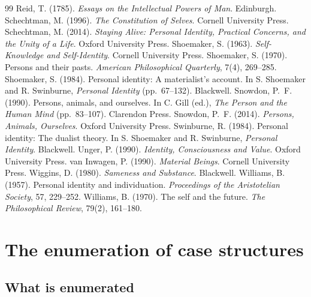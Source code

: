 \documentclass{situationist-preprint}
\begin{document}
\begin{thebibliography}{99}
 Reid, T. (1785). \emph{Essays on the Intellectual Powers of Man}. Edinburgh.
 Schechtman, M. (1996). \emph{The Constitution of Selves}. Cornell University Press.
 Schechtman, M. (2014). \emph{Staying Alive: Personal Identity, Practical Concerns, and the Unity of a Life}. Oxford University Press.
 Shoemaker, S. (1963). \emph{Self-Knowledge and Self-Identity}. Cornell University Press.
 Shoemaker, S. (1970). Persons and their pasts. \emph{American Philosophical Quarterly}, 7(4), 269--285.
 Shoemaker, S. (1984). Personal identity: A materialist's account. In S. Shoemaker and R. Swinburne, \emph{Personal Identity} (pp.~67--132). Blackwell.
 Snowdon, P.~F. (1990). Persons, animals, and ourselves. In C. Gill (ed.), \emph{The Person and the Human Mind} (pp.~83--107). Clarendon Press.
 Snowdon, P.~F. (2014). \emph{Persons, Animals, Ourselves}. Oxford University Press.
 Swinburne, R. (1984). Personal identity: The dualist theory. In S. Shoemaker and R. Swinburne, \emph{Personal Identity}. Blackwell.
 Unger, P. (1990). \emph{Identity, Consciousness and Value}. Oxford University Press.
 van Inwagen, P. (1990). \emph{Material Beings}. Cornell University Press.
 Wiggins, D. (1980). \emph{Sameness and Substance}. Blackwell.
 Williams, B. (1957). Personal identity and individuation. \emph{Proceedings of the Aristotelian Society}, 57, 229--252.
 Williams, B. (1970). The self and the future. \emph{The Philosophical Review}, 79(2), 161--180.
\end{thebibliography}

\clearpage
\appendix
\section{The enumeration of case structures}\label{s:appendix}

\subsection*{What is enumerated}
\end{document}

